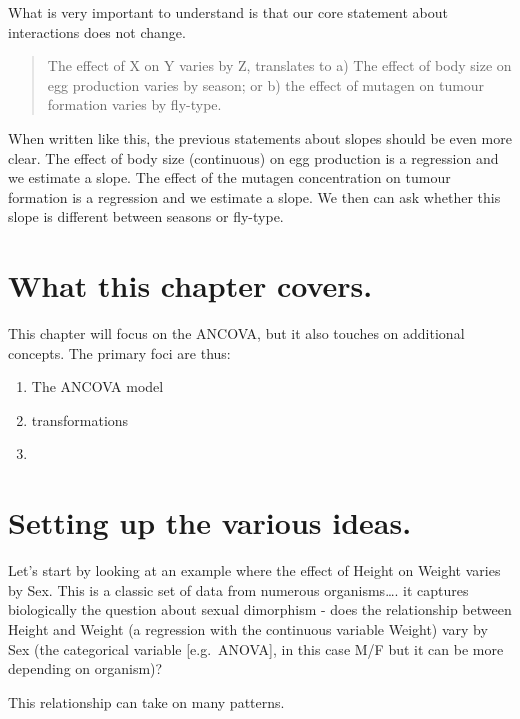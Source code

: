\documentclass[
]{book}
\providecommand{\tightlist}{%
  \setlength{\itemsep}{0pt}\setlength{\parskip}{0pt}}
\begin{document}
What is very important to understand is that our core statement about interactions does not change.

\begin{quote}
The effect of X on Y varies by Z, translates to a) The effect of body size on egg production varies by season; or b) the effect of mutagen on tumour formation varies by fly-type.
\end{quote}

When written like this, the previous statements about slopes should be even more clear. The effect of body size (continuous) on egg production is a regression and we estimate a slope. The effect of the mutagen concentration on tumour formation is a regression and we estimate a slope. We then can ask whether this slope is different between seasons or fly-type.

\hypertarget{what-this-chapter-covers.}{%
\section{What this chapter covers.}\label{what-this-chapter-covers.}}

This chapter will focus on the ANCOVA, but it also touches on additional concepts. The primary foci are thus:

\begin{enumerate}
\def\labelenumi{\arabic{enumi}.}
\tightlist
\item
  The ANCOVA model
\item
  transformations
\item
\end{enumerate}

\hypertarget{setting-up-the-various-ideas.}{%
\section{Setting up the various ideas.}\label{setting-up-the-various-ideas.}}

Let's start by looking at an example where the effect of Height on Weight varies by Sex. This is a classic set of data from numerous organisms\ldots. it captures biologically the question about sexual dimorphism - does the relationship between Height and Weight (a regression with the continuous variable Weight) vary by Sex (the categorical variable {[}e.g.~ANOVA{]}, in this case M/F but it can be more depending on organism)?

This relationship can take on many patterns.
\end{document}
